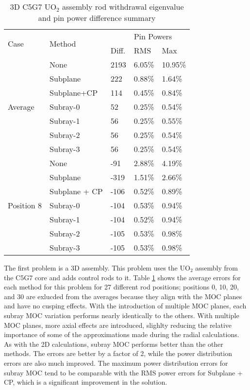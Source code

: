 \begin{table}[h]
    \centering
    \caption[3D C5G7 UO$_2$ Assembly Recombination Sensitivity]{3D C5G7 UO$_2$ assembly rod withdrawal eigenvalue and pin power difference summary}\label{t:c5g7-3d-assembly}
    \begin{tabular}{l l l l l}\toprule
        \multirow{2}{*}{Case} & \multirow{2}{*}{Method} & \keff{} & \multicolumn{2}{l}{Pin Powers} \\
        &  & Diff. & RMS & Max \\\midrule
        \multirow{7}{*}{Average} & None        & 2193 & 6.05\% & 10.95\% \\
        & Subplane    & 222  & 0.88\% &  1.64\% \\
        & Subplane+CP & 114  & 0.45\% &  0.84\% \\
        & Subray-0    & 52   & 0.25\% &  0.54\% \\
        & Subray-1    & 56   & 0.25\% &  0.55\% \\
        & Subray-2    & 56   & 0.25\% &  0.54\% \\
        & Subray-3    & 56   & 0.25\% &  0.54\% \\
        \midrule
        \multirow{7}{*}{Position 8} & None          & -91 & 2.88\% & 4.19\% \\
        & Subplane      & -319  & 1.51\% & 2.66\% \\
        & Subplane + CP & -106 & 0.52\% & 0.89\% \\
        & Subray-0      & -104 & 0.53\% & 0.94\% \\
        & Subray-1      & -104 & 0.52\% & 0.94\% \\
        & Subray-2      & -105 & 0.53\% & 0.98\% \\
        & Subray-3      & -105 & 0.53\% & 0.98\% \\
        \bottomrule
    \end{tabular}
\end{table}

The first problem is a 3D assembly.  This problem uses the UO$_2$ assembly from the C5G7 core and adds control rods to it.  Table \ref{t:c5g7-3d-assembly} shows the average errors for each method for this problem for 27 different rod positions; positions 0, 10, 20, and 30 are exlucded from the averages because they align with the MOC planes and have no cusping effects.  With the introduction of multiple MOC planes, each subray MOC variation performs nearly identically to the others.  With multiple MOC planes, more axial effects are introduced, slighlty reducing the relative importance of some of the approximations made during the radial calculations.  As with the 2D calculations, subray MOC performs better than the other methods.  The \keff{} errors are better by a factor of 2, while the power distribution errors are also much improved.  The maximum power distribution errors for subray MOC tend to be comparable with the RMS power errors for Subplane + CP, which is a significant improvement in the solution.

